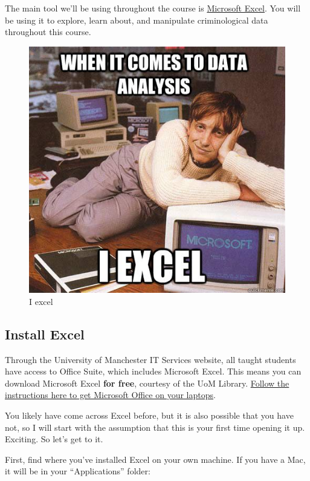 \documentclass[
]{book}
\begin{document}
The main tool we'll be using throughout the course is \href{https://en.wikipedia.org/wiki/Microsoft_Excel}{Microsoft Excel}. You will be using it to explore, learn about, and manipulate criminological data throughout this course.

\begin{figure}
\centering
\includegraphics{imgs/bill_gates_excel.jpg}
\caption{I excel}
\end{figure}

\hypertarget{install-excel}{%
\subsection{Install Excel}\label{install-excel}}

Through the University of Manchester IT Services website, all taught students have access to Office Suite, which includes Microsoft Excel. This means you can download Microsoft Excel \textbf{for free}, courtesy of the UoM Library. \href{http://www.itservices.manchester.ac.uk/students/office365/}{Follow the instructions here to get Microsoft Office on your laptops}.

You likely have come across Excel before, but it is also possible that you have not, so I will start with the assumption that this is your first time opening it up. Exciting. So let's get to it.

First, find where you've installed Excel on your own machine. If you have a Mac, it will be in your ``Applications'' folder:
\end{document}

